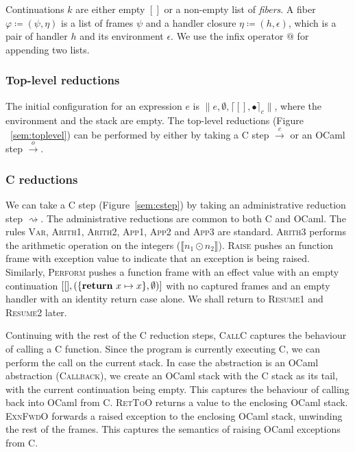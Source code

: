 \documentclass[sigplan,10pt,review,anonymous]{acmart}\settopmatter{printfolios=true,printccs=false,printacmref=false}
\newcommand{\env}{\epsilon}
\newcommand{\kw}[1]{\text{\bf #1}}
\newcommand{\caseval}[2]{\kw{return}~#1 \mapsto #2}
\newcommand{\fiber}{\varphi}
\newcommand{\fl}{\psi} %
\newcommand{\hc}{\eta} %
\newcommand{\cstacka}[2]{\big \lceil #1, #2 \big \rceil_c} %
\newcommand{\configa}[3]{\|#1,#2,#3\|}
\newcommand{\ostep}{\xrightarrow{o}}
\newcommand{\cstep}{\xrightarrow{c}}
\begin{document}
Continuations $k$ are either empty $[]$ or a non-empty list of \emph{fibers}. A
fiber $\fiber \coloneqq (\fl,\hc)$ is a list of frames $\fl$ and a handler
closure $\hc \coloneqq (h,\env)$, which is a pair of handler $h$ and its
environment $\env$. We use the infix operator $@$ for appending two lists.

\vspace{-1mm}
\subsubsection{Top-level reductions}

The initial configuration for an expression $e$ is
$\configa{e}{\emptyset}{\cstacka{[]}{\bullet}}$, where the environment and the
stack are empty. The top-level reductions (Figure ~\ref{sem:toplevel}) can be
performed by either by taking a C step $\cstep$ or an OCaml step $\ostep$.

\vspace{-1mm}
\subsubsection{C reductions}

We can take a C step (Figure~\ref{sem:cstep}) by taking an administrative
reduction step $\rightsquigarrow$. The administrative reductions are common to
both C and OCaml. The rules \textsc{Var}, \textsc{Arith1}, \textsc{Arith2},
\textsc{App1}, \textsc{App2} and \textsc{App3} are standard. \textsc{Arith3}
performs the arithmetic operation on the integers ($\llbracket n_1 \odot n_2
\rrbracket$). \textsc{Raise} pushes an function frame with exception value to
indicate that an exception is being raised. Similarly, \textsc{Perform} pushes
a function frame with an effect value with an empty continuation
$[[],(\{\caseval{x}{x}\},\emptyset)]$ with no captured frames and an empty
handler with an identity return case alone. We shall return to \textsc{Resume1}
and \textsc{Resume2} later.

Continuing with the rest of the C reduction steps, \textsc{CallC} captures the
behaviour of calling a C function. Since the program is currently executing C,
we can perform the call on the current stack. In case the abstraction is an
OCaml abstraction (\textsc{Callback}), we create an OCaml stack with the C
stack as its tail, with the current continuation being empty. This captures the
behaviour of calling back into OCaml from C. \textsc{RetToO} returns a value to
the enclosing OCaml stack. \textsc{ExnFwdO} forwards a raised exception to the
enclosing OCaml stack, unwinding the rest of the frames. This captures the
semantics of raising OCaml exceptions from C.
\end{document}
